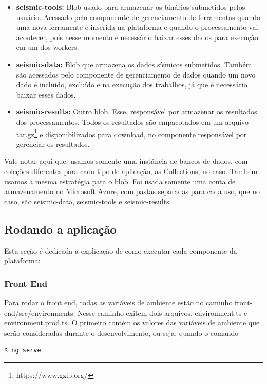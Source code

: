 \documentclass[11pt,twoside]{article}
\begin{document}
\begin{itemize}
  \item \textbf{seismic-tools:} Blob usado para armazenar os binários submetidos pelos usuário. Acessado pelo componemte de gerenciamento de ferramentas quando uma nova ferramente é inserida na plataforma 
  e quando o processamento vai acontecer, pois nesse momento é necessário baixar esses dados para execução em um dos workers.
  \item \textbf{seismic-data:} Blob que armazena os dados sísmicos submetidos. Também são acessados pelo componente de gerenciamento de dados quando um novo dado é incluido, excluído e na execução dos 
  trabalhos, já que é necessário baixar esses dados.
  \item \textbf{seismic-results:} Outro blob. Esse, responsável por armazenar os resultados dos processamentos. Todos os resultados são empacotados em um arquivo tar.gz\footnote{https://www.gzip.org/} e disponibilizados para download, 
  no componente responsável por gerenciar os resultados.
\end{itemize}

Vale notar aqui que, usamos somente uma instância de bancos de dados, com coleções diferentes para cada tipo de aplicação, as Collections, no caso. Também usamos a mesma estratégia para o blob. Foi usada somente 
uma conta de armazenamento no Microsoft Azure, com pastas separadas para cada uso, que no caso, são seismic-data, seismic-tools e seismic-results. 

\subsection{Rodando a aplicação}

Esta seção é dedicada a explicação de como executar cada componente da plataforma:

\subsubsection{Front End}

Para rodar o front end, todas as variáveis de ambiente estão no caminho front-end/src/environments. Nesse caminho exitem dois arquivos, environment.ts e environment.prod.ts.
O primeiro contém os valores das variáveis de ambiente que serão consideradas durante o desenvolvimento, ou seja, quando o comando

\begin{lstlisting}[language=bash]
  $ ng serve 
\end{lstlisting}
\end{document}
